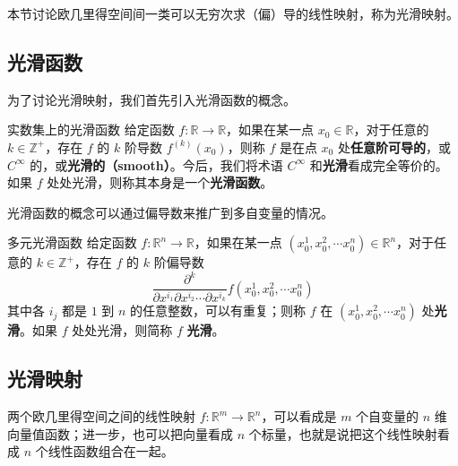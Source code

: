 


本节讨论欧几里得空间间一类可以无穷次求（偏）导的线性映射，称为光滑映射。

\subsection{光滑函数}

为了讨论光滑映射，我们首先引入光滑函数的概念。

\begin{definition}{实数集上的光滑函数}
给定函数 $f:\mathbb{R}\rightarrow\mathbb{R}$，如果在某一点 $x_0\in\mathbb{R}$，对于任意的 $k\in\mathbb{Z}^+$，存在 $f$ 的 $k$ 阶导数 $f^{(k)}(x_0)$，则称 $f$ 是在点 $x_0$ 处\textbf{任意阶可导的}，或 $C^\infty$ 的，或\textbf{光滑的（smooth）}。今后，我们将术语 $C^{\infty}$ 和\textbf{光滑}看成完全等价的。如果 $f$ 处处光滑，则称其本身是一个\textbf{光滑函数}。
\end{definition}

光滑函数的概念可以通过偏导数来推广到多自变量的情况。

\begin{definition}{多元光滑函数}
给定函数 $f:\mathbb{R}^n\rightarrow\mathbb{R}$，如果在某一点 $(x_0^1, x_0^2, \cdots x_0^n) \in\mathbb{R}^n$，对于任意的 $k\in\mathbb{Z}^+$，存在 $f$ 的 $k$ 阶偏导数$$\frac{\partial^k}{\partial x^{i_1}\partial x^{i_2}\cdots\partial x^{i_k}}f(x_0^1, x_0^2, \cdots x_0^n)$$其中各 $i_j$ 都是 $1$ 到 $n$ 的任意整数，可以有重复；则称 $f$ 在 $(x_0^1, x_0^2, \cdots x_0^n)$ 处\textbf{光滑}。如果 $f$ 处处光滑，则简称 $f$ \textbf{光滑}。
\end{definition}

\subsection{光滑映射}

两个欧几里得空间之间的线性映射 $f:\mathbb{R}^m\rightarrow \mathbb{R}^n$，可以看成是 $m$ 个自变量的 $n$ 维向量值函数；进一步，也可以把向量看成 $n$ 个标量，也就是说把这个线性映射看成 $n$ 个线性函数组合在一起。

